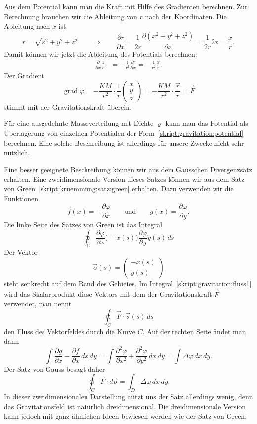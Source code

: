Aus dem Potential kann man die Kraft mit Hilfe des Gradienten
berechnen.
Zur Berechnung brauchen wir die Ableitung von $r$ nach den Koordinaten.
Die Ableitung nach $x$ ist
\[
r=\sqrt{x^2+y^2+z^2}
\qquad\Rightarrow\qquad
\frac{\partial r}{\partial x}
=
\frac{1}{2r} \frac{\partial (x^2+y^2+z^2)}{\partial x}
=
\frac{1}{2r} 2x=\frac{x}{r}.
\]
Damit können wir jetzt die Ableitung des Potentials berechnen:
\begin{align*}
\frac{\partial}{\partial x}\frac1{r}
&=
-\frac{1}{r^2} \frac{\partial r}{\partial x}
=
-\frac{1}{r^2} \frac{x}{r}.
\end{align*}
Der Gradient
\[
\operatorname{grad}\varphi
=
-\frac{KM}{r^2}\cdot\frac1r\begin{pmatrix}x\\y\\z\end{pmatrix}
=
-\frac{KM}{r^2}\cdot\frac{\vec r}{r} = \vec F
\]
stimmt mit der Gravitationskraft überein.

Für eine ausgedehnte Masseverteilung mit Dichte $\varrho$ kann man das
Potential als Überlagerung von einzelnen Potentialen der
Form~\eqref{skript:gravitation:potential} berechnen.
Eine solche Beschreibung
ist allerdings für unsere Zwecke nicht sehr nützlich.

Eine besser geeignete Beschreibung können wir aus dem Gausschen
Divergenzsatz erhalten.
Eine zweidimensionale Version dieses Satzes können wir
aus dem Satz von Green~\eqref{skript:kruemmung:satz:green}
erhalten.
Dazu verwenden wir die Funktionen 
\[
f(x)=-\frac{\partial \varphi}{\partial x}
\qquad\text{und}\qquad
g(x)=\frac{\partial \varphi}{\partial y}.
\]
Die linke Seite des Satzes von Green ist das Integral
\begin{equation}
\oint_{C}
\frac{\partial \varphi}{\partial x} \dot (-x(s))
\frac{\partial \varphi}{\partial y} \dot y(s)
\,ds
\label{skript:gravitation:fluss1}
\end{equation}
Der Vektor
\[
\vec o(s) = \begin{pmatrix}-\dot x(s)\\\dot y(s)\end{pmatrix}
\]
steht senkrecht auf dem Rand des Gebietes.
Im Integral~\eqref{skript:gravitation:fluss1} wird das Skalarprodukt
diese Vektors mit dem der Gravitationskraft $\vec F$ verwendet,
man nennt
\[
\oint_{C} \vec F\cdot \vec o(s)\,ds
\]
den Fluss des Vektorfeldes durch die Kurve $C$.
Auf der rechten Seite findet man dann 
\[
\int \frac{\partial g}{\partial x}-\frac{\partial f}{\partial x}\,dx\,dy
=
\int
\frac{\partial^2\varphi}{\partial x^2}
+
\frac{\partial^2\varphi}{\partial y^2}
\,dx\,dy
=
\int\Delta\varphi \,dx\,dy.
\]
Der Satz von Gauss besagt daher
\[
\oint_{C} \vec F\cdot d\vec o
=
\int_{D} \Delta\varphi\,dx\,dy.
\]
In dieser zweidimensionalen Darstellung nützt uns der Satz allerdings
wenig, denn das Gravitationsfeld ist natürlich dreidimensional.
Die dreidimensionale Version kann jedoch mit ganz ähnlichen Ideen
bewiesen werden wie der Satz von Green:

